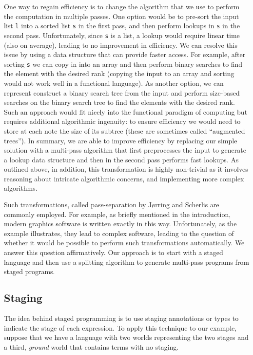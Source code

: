 \begin{abstrsyn}
One way to regain efficiency is to change the algorithm that we use to
perform the computation in multiple passes.  One option would be to
pre-sort the input list \texttt{l} into a sorted list \texttt{s} in
the first pass, and then perform lookups in \texttt{s} in the second
pass.  Unfortunately, since \texttt{s} is a list, a lookup would
require linear time (also on average), leading to no improvement in
efficiency.  We can resolve this issue by using a data structure that
can provide faster access.  For example, after sorting \texttt{s} we
can copy in into an array and then perform binary searches to find the
element with the desired rank (copying the input to an array and
sorting would not work well in a functional language).  As another
option, we can represent construct a binary search tree from the input
and perform size-based searches on the binary search tree to find the
elements with the desired rank.  Such an approach would fit nicely
into the functional paradigm of computing but requires additional
algorithmic ingenuity: to ensure efficiency we would need to store at
each note the size of its subtree (these are sometimes called
``augmented trees'').  In summary, we are able to improve efficiency
by replacing our simple solution with a multi-pass algorithm that
first preprocesses the input to generate a lookup data structure and
then in the second pass performs fast lookups.  As outlined above, in
addition, this transformation is highly non-trivial as it involves
reasoning about intricate algorithmic concerns, and implementing more
complex algorithms.

Such transformations, called pass-separation by J{\o}rring and
Scherlis are commonly employed.  For example, as briefly mentioned in
the introduction, modern graphics software is written exactly in this
way.  Unfortunately, as the example illustrates, they lead to complex
software, leading to the question of whether it would be possible to
perform such transformations automatically.  We answer this question
affirmatively.  Our approach is to start with a staged language and
then use a splitting algorithm to generate multi-pass programs from
staged programs.


\subsection{Staging}

The idea behind staged programming is to use staging annotations or
types to indicate the stage of each expression.  To apply this
technique to our example, suppose that we have a language with two
worlds representing the two stages and a third, {\em ground} world
that contains terms with no staging.


\end{abstrsyn}
